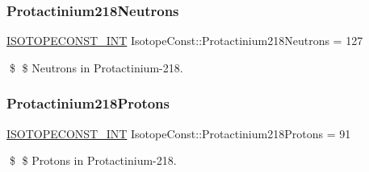 \subsubsection{\texorpdfstring{Protactinium218\+Neutrons}{Protactinium218Neutrons}}
{\footnotesize\ttfamily \mbox{\hyperlink{group___isotope_const-_macros_ga5f18360b3e99483a35c32d789e62621c}{I\+S\+O\+T\+O\+P\+E\+C\+O\+N\+S\+T\+\_\+\+I\+NT}} Isotope\+Const\+::\+Protactinium218\+Neutrons = 127}

\$ \$ Neutrons in Protactinium-\/218. \mbox{\label{group___isotope_const-_protactinium-_pa218_ga100b6231bb57fe8a3ea5161f7aa971a5}} 
\subsubsection{\texorpdfstring{Protactinium218\+Protons}{Protactinium218Protons}}
{\footnotesize\ttfamily \mbox{\hyperlink{group___isotope_const-_macros_ga5f18360b3e99483a35c32d789e62621c}{I\+S\+O\+T\+O\+P\+E\+C\+O\+N\+S\+T\+\_\+\+I\+NT}} Isotope\+Const\+::\+Protactinium218\+Protons = 91}

\$ \$ Protons in Protactinium-\/218. 